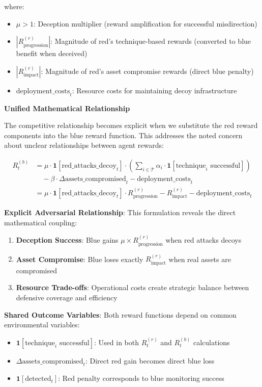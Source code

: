 \documentclass[12pt,oneside]{article}
\begin{document}
where:
\begin{itemize}
    \item $\mu > 1$: Deception multiplier (reward amplification for successful misdirection)
    \item $|R^{(r)}_{\text{progression}}|$: Magnitude of red's technique-based rewards (converted to blue benefit when deceived)
    \item $|R^{(r)}_{\text{impact}}|$: Magnitude of red's asset compromise rewards (direct blue penalty)
    \item $\text{deployment\_costs}_t$: Resource costs for maintaining decoy infrastructure
\end{itemize}

\textbf{Unified Mathematical Relationship}

The competitive relationship becomes explicit when we substitute the red reward components into the blue reward function. This addresses the noted concern about unclear relationships between agent rewards:

\begin{align}
R^{(b)}_t &= \mu \cdot \mathbf{1}[\text{red\_attacks\_decoy}_t] \cdot \left(\sum_{i \in \mathcal{T}} \alpha_i \cdot \mathbf{1}[\text{technique}_i \text{ successful}]\right) \\
&\quad - \beta \cdot \Delta\text{assets\_compromised}_t - \text{deployment\_costs}_t \\
&= \mu \cdot \mathbf{1}[\text{red\_attacks\_decoy}_t] \cdot R^{(r)}_{\text{progression}} - R^{(r)}_{\text{impact}} - \text{deployment\_costs}_t
\end{align}

\textbf{Explicit Adversarial Relationship}: This formulation reveals the direct mathematical coupling:
\begin{enumerate}
    \item \textbf{Deception Success}: Blue gains $\mu \times R^{(r)}_{\text{progression}}$ when red attacks decoys
    \item \textbf{Asset Compromise}: Blue loses exactly $R^{(r)}_{\text{impact}}$ when real assets are compromised  
    \item \textbf{Resource Trade-offs}: Operational costs create strategic balance between defensive coverage and efficiency
\end{enumerate}

\textbf{Shared Outcome Variables}: Both reward functions depend on common environmental variables:
\begin{itemize}
    \item $\mathbf{1}[\text{technique}_i \text{ successful}]$: Used in both $R^{(r)}_t$ and $R^{(b)}_t$ calculations
    \item $\Delta\text{assets\_compromised}_t$: Direct red gain becomes direct blue loss
    \item $\mathbf{1}[\text{detected}_t]$: Red penalty corresponds to blue monitoring success
\end{itemize}
\end{document}
